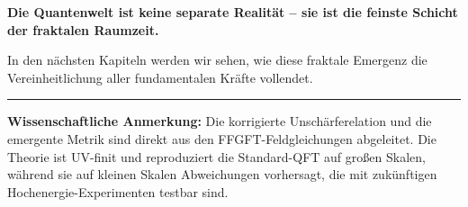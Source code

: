 	\textbf{Die Quantenwelt ist keine separate Realität – sie ist die feinste Schicht der fraktalen Raumzeit.}
	
	In den nächsten Kapiteln werden wir sehen, wie diese fraktale Emergenz die Vereinheitlichung aller fundamentalen Kräfte vollendet.
	
	\vspace{1cm}
	\hrule
	\vspace{0.5cm}
	\noindent\textbf{Wissenschaftliche Anmerkung:} Die korrigierte Unschärferelation und die emergente Metrik sind direkt aus den FFGFT-Feldgleichungen abgeleitet. Die Theorie ist UV-finit und reproduziert die Standard-QFT auf großen Skalen, während sie auf kleinen Skalen Abweichungen vorhersagt, die mit zukünftigen Hochenergie-Experimenten testbar sind.




